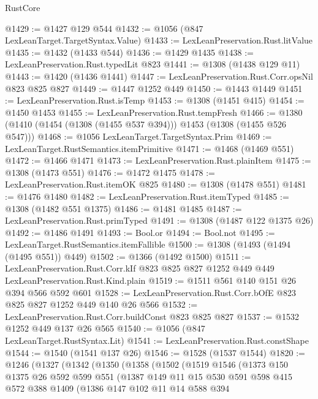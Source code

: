 \begin{lexlean}{RustCore}
\begin{coremodule}
@1429 := @1427 @129 @544
@1432 := @1056 (@847 LexLeanTarget.TargetSyntax.Value)
@1433 := LexLeanPreservation.Rust.litValue
@1435 := @1432 (@1433 @544)
@1436 := @1429 @1435
@1438 := LexLeanPreservation.Rust.typedLit @823
@1441 := @1308 (@1438 @129 @11)
@1443 := @1420 (@1436 @1441)
@1447 := LexLeanPreservation.Rust.Corr.opsNil @823 @825 @827
@1449 := @1447 @1252 @449
@1450 := @1443 @1449
@1451 := LexLeanPreservation.Rust.isTemp
@1453 := @1308 (@1451 @415)
@1454 := @1450 @1453
@1455 := LexLeanPreservation.Rust.tempFresh
@1466 := @1380 (@1410 (@1454 (@1308 (@1455 @537 @394))) @1453 (@1308 (@1455 @526 @547)))
@1468 := @1056 LexLeanTarget.TargetSyntax.Prim
@1469 := LexLeanTarget.RustSemantics.itemPrimitive
@1471 := @1468 (@1469 @551)
@1472 := @1466 @1471
@1473 := LexLeanPreservation.Rust.plainItem
@1475 := @1308 (@1473 @551)
@1476 := @1472 @1475
@1478 := LexLeanPreservation.Rust.itemOK @825
@1480 := @1308 (@1478 @551)
@1481 := @1476 @1480
@1482 := LexLeanPreservation.Rust.itemTyped
@1485 := @1308 (@1482 @551 @1375)
@1486 := @1481 @1485
@1487 := LexLeanPreservation.Rust.primTyped
@1491 := @1308 (@1487 @122 @1375 @26)
@1492 := @1486 @1491
@1493 := Bool.or
@1494 := Bool.not
@1495 := LexLeanTarget.RustSemantics.itemFallible
@1500 := @1308 (@1493 (@1494 (@1495 @551)) @449)
@1502 := @1366 (@1492 @1500)
@1511 := LexLeanPreservation.Rust.Corr.kIf
    @823
    @825
    @827
    @1252
    @449
    @449
    LexLeanPreservation.Rust.Kind.plain
@1519 := @1511 @561 @140 @151 @26 @394 @566 @592 @601
@1528 := LexLeanPreservation.Rust.Corr.bOfE @823 @825 @827 @1252 @449 @140 @26 @566
@1532 := LexLeanPreservation.Rust.Corr.buildConst @823 @825 @827
@1537 := @1532 @1252 @449 @137 @26 @565
@1540 := @1056 (@847 LexLeanTarget.RustSyntax.Lit)
@1541 := LexLeanPreservation.Rust.constShape
@1544 := @1540 (@1541 @137 @26)
@1546 := @1528 (@1537 @1544)
@1820 := @1246
    (@1327
      (@1342
        (@1350
          (@1358
            (@1502
              (@1519
                @1546
                (@1373
                  @150
                  @1375
                  @26
                  @592
                  @599
                  @551
                  (@1387
                    @149
                    @11
                    @15
                    @530
                    @591
                    @598
                    @415
                    @572
                    @388
                    @1409
                    (@1386
                      @147
                      @102
                      @11
                      @14
                      @588
                      @394

\end{coremodule}
\end{lexlean}
